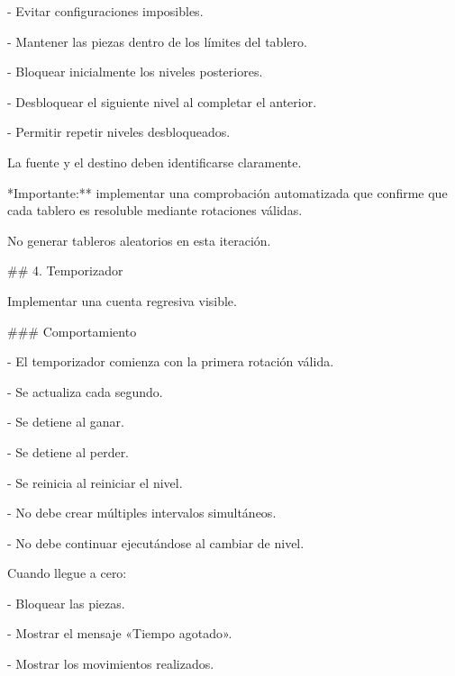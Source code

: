 \noindent - Evitar configuraciones imposibles.\par
\noindent - Mantener las piezas dentro de los límites del tablero.\par
\noindent - Bloquear inicialmente los niveles posteriores.\par
\noindent - Desbloquear el siguiente nivel al completar el anterior.\par
\noindent - Permitir repetir niveles desbloqueados.\par
\par\smallskip
\noindent La fuente y el destino deben identificarse claramente.\par
\par\smallskip
\noindent **Importante:** implementar una comprobación automatizada que confirme que cada tablero es resoluble mediante rotaciones válidas.\par
\par\smallskip
\noindent No generar tableros aleatorios en esta iteración.\par
\par\smallskip
\noindent \#\# 4. Temporizador\par
\par\smallskip
\noindent Implementar una cuenta regresiva visible.\par
\par\smallskip
\noindent \#\#\# Comportamiento\par
\par\smallskip
\noindent - El temporizador comienza con la primera rotación válida.\par
\noindent - Se actualiza cada segundo.\par
\noindent - Se detiene al ganar.\par
\noindent - Se detiene al perder.\par
\noindent - Se reinicia al reiniciar el nivel.\par
\noindent - No debe crear múltiples intervalos simultáneos.\par
\noindent - No debe continuar ejecutándose al cambiar de nivel.\par
\par\smallskip
\noindent Cuando llegue a cero:\par
\par\smallskip
\noindent - Bloquear las piezas.\par
\noindent - Mostrar el mensaje «Tiempo agotado».\par
\noindent - Mostrar los movimientos realizados.\par
